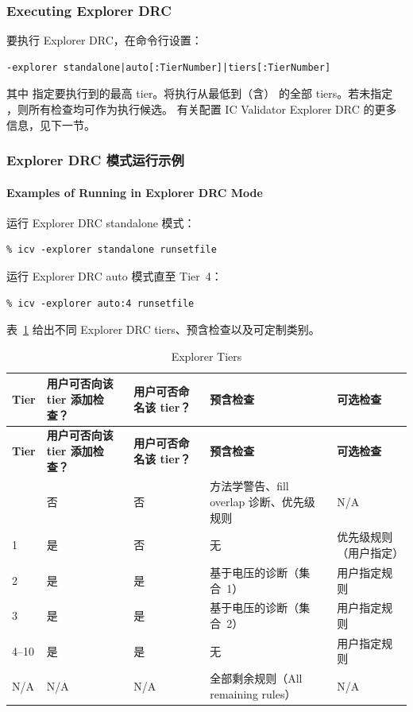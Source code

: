 \subsubsection*{Executing Explorer DRC}

要执行 Explorer DRC，在命令行设置：
\begin{lstlisting}
-explorer standalone|auto[:TierNumber]|tiers[:TierNumber]
\end{lstlisting}
其中  指定要执行到的最高 tier。将执行从最低到（含） 的全部 tiers。若未指定 ，则所有检查均可作为执行候选。
有关配置 IC Validator Explorer DRC 的更多信息，见下一节。

\subsubsection{Explorer DRC 模式运行示例}
\paragraph*{Examples of Running in Explorer DRC Mode}

运行 Explorer DRC standalone 模式：
\begin{lstlisting}
% icv -explorer standalone runsetfile
\end{lstlisting}

运行 Explorer DRC auto 模式直至 Tier~4：
\begin{lstlisting}
% icv -explorer auto:4 runsetfile
\end{lstlisting}

表~\ref{tab:explorer-tiers} 给出不同 Explorer DRC tiers、预含检查以及可定制类别。

\begin{longtable}{@{}p{} p{} p{} p{} p{}@{}}
\caption{Explorer Tiers}\label{tab:explorer-tiers}\\
\toprule
\textbf{Tier} & \textbf{用户可否向该 tier 添加检查？} & \textbf{用户可否命名该 tier？} & \textbf{预含检查} & \textbf{可选检查} \\
\midrule
\endfirsthead
\toprule
\textbf{Tier} & \textbf{用户可否向该 tier 添加检查？} & \textbf{用户可否命名该 tier？} & \textbf{预含检查} & \textbf{可选检查} \\
\midrule
\endhead
\bottomrule
\endfoot
0 & 否 & 否 & 方法学警告、fill overlap 诊断、优先级规则 & N/A \\
1 & 是 & 否 & 无 & 优先级规则（用户指定） \\
2 & 是 & 是 & 基于电压的诊断（集合~1） & 用户指定规则 \\
3 & 是 & 是 & 基于电压的诊断（集合~2） & 用户指定规则 \\
4--10 & 是 & 是 & 无 & 用户指定规则 \\
N/A & N/A & N/A & 全部剩余规则（All remaining rules） & N/A \\
\end{longtable}


